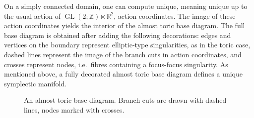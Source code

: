 \documentclass[12pt,a4paper,abstract=true,final]{scrartcl}
\begin{document}
On a simply connected domain, one can compute unique, meaning unique up to the usual action of $\operatorname{GL}(2;\mathbb{Z}) \ltimes \mathbb{R}^2$, action coordinates.
The image of these action coordinates yields the interior of the almost toric base diagram.
The full base diagram is obtained after adding the following decorations: edges and vertices on the boundary represent elliptic-type singularities, as in the toric case, dashed lines represent the image of the branch cuts in action coordinates, and crosses represent nodes, i.e.\ fibres containing a focus-focus singularity.
As mentioned above, a fully decorated almost toric base diagram defines a unique symplectic manifold.

\begin{figure}
  \centering
  \caption{An almost toric base diagram.
Branch cuts are drawn with dashed lines, nodes marked with crosses.}
  \label{fig:atf_example}
\end{figure}
\end{document}
